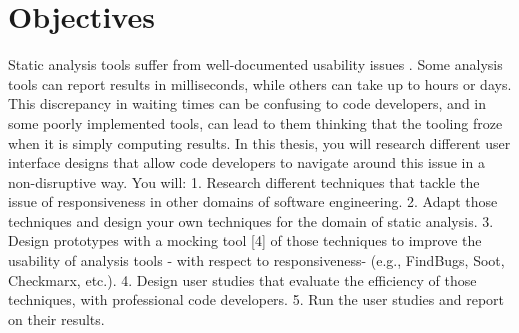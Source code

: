 \chapter{Objectives}
\label{ch:objectives}

Static analysis tools suffer from well-documented usability issues \cite{CB16,JSMB13}. Some analysis tools can report results in milliseconds, while others can take up to hours or
days. This discrepancy in waiting times can be confusing to code developers, and in some poorly implemented
tools, can lead to them thinking that the tooling froze when it is simply computing results.
In this thesis, you will research different user interface designs that allow code developers to navigate around
this issue in a non-disruptive way. You will:
1. Research different techniques that tackle the issue of responsiveness in other domains of software
engineering.
2. Adapt those techniques and design your own techniques for the domain of static analysis.
3. Design prototypes with a mocking tool [4] of those techniques to improve the usability of analysis tools -
with respect to responsiveness- (e.g., FindBugs, Soot, Checkmarx, etc.).
4. Design user studies that evaluate the efficiency of those techniques, with professional code developers.
5. Run the user studies and report on their results.